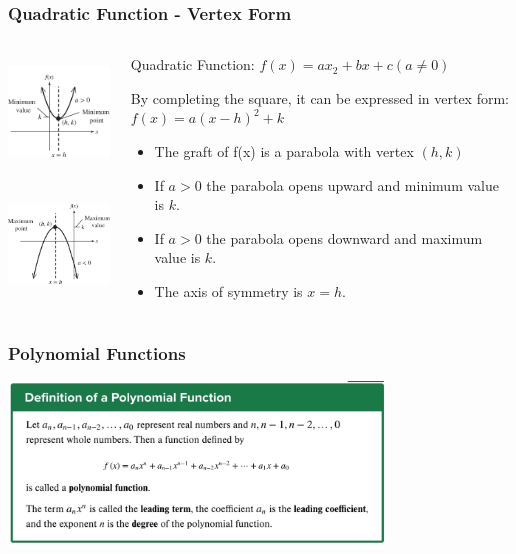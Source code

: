 \documentclass{beamer}
\begin{document}
\begin{frame}\frametitle{Quadratic Function - Vertex Form}
\begin{columns}
\begin{column}{3.5cm}
\begin{center}
\includegraphics[height=3cm]{fig/quadup.png}

\vspace{0.25cm}

\includegraphics[height=3cm]{fig/quaddown.png}
\end{center}
\end{column}
\begin{column}{7.5cm}
Quadratic Function: $f(x) = ax_2 + bx + c (a \neq 0)$

By completing the square, it can be expressed in vertex form: $f(x) = a(x-h)^2 + k$
\begin{itemize}
\item The graft of f(x) is a parabola with vertex $(h,k)$
\item If $a>0$ the parabola opens upward and minimum value is $k$.
\item If $a>0$ the parabola opens downward and maximum value is $k$.
\item The axis of symmetry is $x=h$.
\end{itemize}
\end{column}
\end{columns}
\end{frame}


\begin{frame}\frametitle{Polynomial Functions}

\begin{center}
\includegraphics[width=10cm]{fig/poly1.jpg}
\end{center}

\end{frame}
\end{document}
